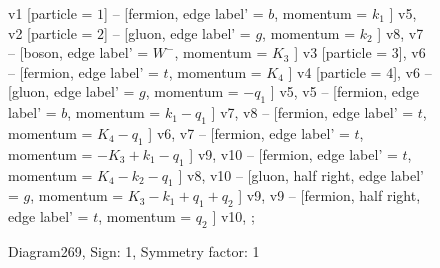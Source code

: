 \documentclass{revtex4}
\begin{document}
\begin{figure}[!htb]
\begin{center}
{    %
v1 [particle = \(1\)] -- [fermion, edge label' = \(b\), momentum = \(k_{1}\) ] v5, 
v2 [particle = \(2\)] -- [gluon, edge label' = \(g\), momentum = \(k_{2}\) ] v8, 
v7 -- [boson, edge label' = \(W^{-}\), momentum = \(K_{3}\) ] v3 [particle = \(3\)], 
v6 -- [fermion, edge label' = \(t\), momentum = \(K_{4}\) ] v4 [particle = \(4\)], 
v6 -- [gluon, edge label' = \(g\), momentum = \(-q_{1}\) ] v5, 
v5 -- [fermion, edge label' = \(b\), momentum = \(k_{1} - q_{1}\) ] v7, 
v8 -- [fermion, edge label' = \(t\), momentum = \(K_{4} - q_{1}\) ] v6, 
v7 -- [fermion, edge label' = \(t\), momentum = \(-K_{3} + k_{1} - q_{1}\) ] v9, 
v10 -- [fermion, edge label' = \(t\), momentum = \(K_{4} - k_{2} - q_{1}\) ] v8, 
v10 -- [gluon, half right, edge label' = \(g\), momentum = \(K_{3} - k_{1} + q_{1} + q_{2}\) ] v9, 
v9 -- [fermion, half right, edge label' = \(t\), momentum = \(q_{2}\) ] v10, 
};
\end{center}
\caption{Diagram269, Sign: 1, Symmetry factor: 1}
\end{figure}
\newpage
\end{document}
